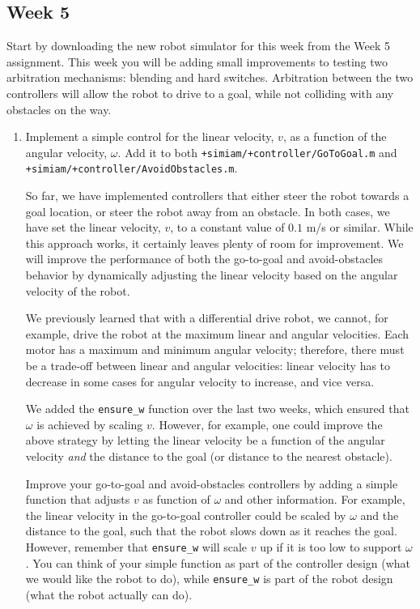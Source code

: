 \documentclass[10pt]{article}
\begin{document}
\newpage
\subsection{Week 5}
Start by downloading the new robot simulator for this week from the Week 5 assignment. This week you will be adding small improvements to  testing two arbitration mechanisms: blending and hard switches. Arbitration between the two controllers will allow the robot to drive to a goal, while not colliding with any obstacles on the way.

\begin{enumerate}
  \item Implement a simple control for the linear velocity, $v$, as a function of the angular velocity, $\omega$. Add it to both \texttt{+simiam/+controller/GoToGoal.m} and \texttt{+simiam/+controller/AvoidObstacles.m}.
  
  So far, we have implemented controllers that either steer the robot towards a goal location, or steer the robot away from an obstacle. In both cases, we have set the linear velocity, $v$, to a constant value of $0.1$ m/s or similar. While this approach works, it certainly leaves plenty of room for improvement. We will improve the performance of both the go-to-goal and avoid-obstacles behavior by dynamically adjusting the linear velocity based on the angular velocity of the robot.
  
We previously learned that with a differential drive robot, we cannot, for example, drive the robot at the maximum linear and angular velocities. Each motor has a maximum and minimum angular velocity; therefore, there must be a trade-off between linear and angular velocities: linear velocity has to decrease in some cases for angular velocity to increase, and vice versa.
  
  We added the \texttt{ensure\_w} function over the last two weeks, which ensured that $\omega$ is achieved by scaling $v$. However, for example, one could improve the above strategy by letting the linear velocity be a function of the angular velocity \textit{and} the distance to the goal (or distance to the nearest obstacle).
  
  Improve your go-to-goal and avoid-obstacles controllers by adding a simple function that adjusts $v$ as function of $\omega$ and other information. For example, the linear velocity in the go-to-goal controller could be scaled by $\omega$ and the distance to the goal, such that the robot slows down as it reaches the goal. However, remember that \texttt{ensure\_w} will scale $v$ up if it is too low to support $\omega$. You can think of your simple function as part of the controller design (what we would like the robot to do), while \texttt{ensure\_w} is part of the robot design (what the robot actually can do). 
  

\end{enumerate}
\end{document}

